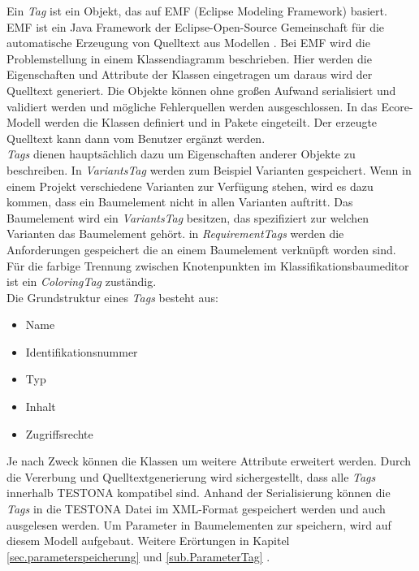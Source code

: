 Ein \textit{Tag} ist ein Objekt, das auf EMF (Eclipse Modeling Framework) basiert. EMF ist ein Java Framework der Eclipse-Open-Source Gemeinschaft für die automatische Erzeugung von Quelltext aus Modellen \cite{EclipseRCP}.  Bei EMF wird die Problemstellung in einem Klassendiagramm beschrieben. Hier werden die Eigenschaften und Attribute der Klassen eingetragen um daraus wird der Quelltext generiert. Die Objekte können ohne großen Aufwand serialisiert und validiert werden und mögliche Fehlerquellen werden ausgeschlossen. In das Ecore-Modell werden die Klassen definiert und in Pakete eingeteilt. Der erzeugte Quelltext kann dann vom Benutzer ergänzt werden.\\



\textit{Tags} dienen hauptsächlich dazu um Eigenschaften anderer Objekte zu beschreiben. In \textit{VariantsTag} werden zum Beispiel  Varianten gespeichert. Wenn in einem Projekt verschiedene Varianten zur Verfügung stehen, wird es dazu kommen, dass ein Baumelement nicht in allen Varianten auftritt. Das Baumelement wird ein \textit{VariantsTag} besitzen, das spezifiziert zur welchen Varianten das Baumelement gehört. in \textit{RequirementTags} werden die Anforderungen gespeichert die an einem Baumelement verknüpft worden sind. Für die farbige Trennung zwischen Knotenpunkten im Klassifikationsbaumeditor ist ein \textit{ColoringTag} zuständig.\\

Die Grundstruktur eines \textit{Tags} besteht aus:

\begin{itemize}
\item Name
\item Identifikationsnummer
\item Typ
\item Inhalt
\item Zugriffsrechte
\end{itemize}


Je nach Zweck können die Klassen um weitere Attribute erweitert werden. Durch die Vererbung und Quelltextgenerierung wird sichergestellt, dass alle \textit{Tags} innerhalb TESTONA kompatibel sind. Anhand der Serialisierung können die \textit{Tags} in die TESTONA Datei im XML-Format gespeichert werden und auch ausgelesen werden. Um Parameter in Baumelementen zur speichern, wird auf diesem Modell aufgebaut. Weitere Erörtungen in Kapitel \ref{sec.parameterspeicherung} und \ref{sub.ParameterTag} .